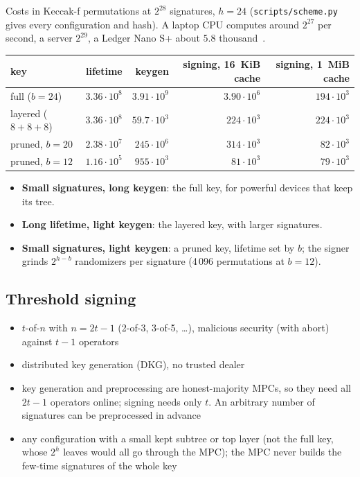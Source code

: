 \documentclass[11pt]{article}
\begin{document}
Costs in Keccak-f permutations at $2^{28}$ signatures, $h=24$ (\texttt{scripts/scheme.py} gives every configuration and hash).
A laptop CPU computes around $2^{27}$ per second, a server $2^{29}$, a Ledger Nano S+ about $5.8$
thousand~\cite{hwbench}.
\begin{center}
\begin{tabular}{lrrrr}
  \toprule
  key & lifetime & keygen & signing, 16~KiB cache & signing, 1~MiB cache \\
  \midrule
  full ($b=24$) & $3.36\cdot10^8$ & $3.91\cdot10^9$ & $3.90\cdot10^6$ & $194\cdot10^3$ \\
  layered ($8+8+8$) & $3.36\cdot10^8$ & $59.7\cdot10^3$ & $224\cdot10^3$ & $224\cdot10^3$ \\
  pruned, $b=20$ & $2.38\cdot10^7$ & $245\cdot10^6$ & $314\cdot10^3$ & $82\cdot10^3$ \\
  pruned, $b=12$ & $1.16\cdot10^5$ & $955\cdot10^3$ & $81\cdot10^3$ & $79\cdot10^3$ \\
  \bottomrule
\end{tabular}
\end{center}
\begin{itemize}
  \item \textbf{Small signatures, long keygen}: the full key, for powerful devices that keep its tree.
  \item \textbf{Long lifetime, light keygen}: the layered key, with larger signatures.
  \item \textbf{Small signatures, light keygen}: a pruned key, lifetime set by $b$; the signer grinds
        $2^{h-b}$ randomizers per signature (4\,096 permutations at $b=12$).
\end{itemize}

\subsection{Threshold signing}
\label{sec:threshold}

\begin{itemize}
  \item $t$-of-$n$ with $n=2t-1$ (2-of-3, 3-of-5, \dots), malicious security (with abort) against $t-1$ operators
  \item distributed key generation (DKG), no trusted dealer
  \item key generation and preprocessing are honest-majority MPCs, so they need all $2t-1$ operators online; signing
        needs only $t$. An arbitrary number of signatures can be preprocessed in advance
  \item any configuration with a small kept subtree or top layer (not the full key, whose $2^h$ leaves would all go
        through the MPC); the MPC never builds the few-time signatures of the whole key
\end{itemize}
\end{document}
